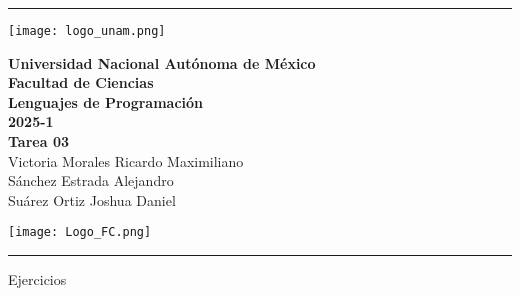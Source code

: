 \documentclass[14pt]{article}
\begin{document}
 

\setlength{\parindent}{0cm} %
\rule{\linewidth}{0.1mm}
\begin{center}
    \begin{minipage}{2.5cm}
    	\begin{center}
	    \texttt{[image: logo\_unam.png]}
    	\end{center}
    \end{minipage}\hfill
    \begin{minipage}{10cm}
    	\begin{center}
    	\textbf{ Universidad Nacional Autónoma de México}\\[0.1cm]
        \textbf{Facultad de Ciencias}\\[0.1cm]
        \textbf{Lenguajes de Programación}\\[0.1cm]
        \textbf{2025-1}\\[0.1cm]
        \textbf{Tarea 03} \\[0.1cm]

        Victoria Morales Ricardo Maximiliano\\
        Sánchez Estrada Alejandro\\
        Suárez Ortiz Joshua Daniel\\
         
    	\end{center}
    \end{minipage}\hfill
    \begin{minipage}{3cm}
    	\begin{center}
    	\texttt{[image: Logo\_FC.png]}
    	\end{center}
    \end{minipage}
\end{center}
\rule{\linewidth}{0.1mm}
\vspace{1mm}

 
Ejercicios\\
\end{document}
